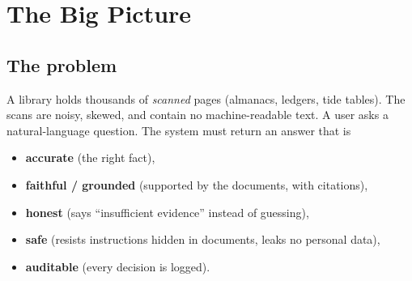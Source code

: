\chapter{The Big Picture}
\section{The problem}
A library holds thousands of \emph{scanned} pages (almanacs, ledgers, tide tables). The scans are noisy, skewed, and contain no machine-readable text. A user asks a natural-language question. The system must return an answer that is
\begin{itemize}
 \item \textbf{accurate} (the right fact),
 \item \textbf{faithful / grounded} (supported by the documents, with citations),
 \item \textbf{honest} (says ``insufficient evidence'' instead of guessing),
 \item \textbf{safe} (resists instructions hidden in documents, leaks no personal data),
 \item \textbf{auditable} (every decision is logged).
\end{itemize}

